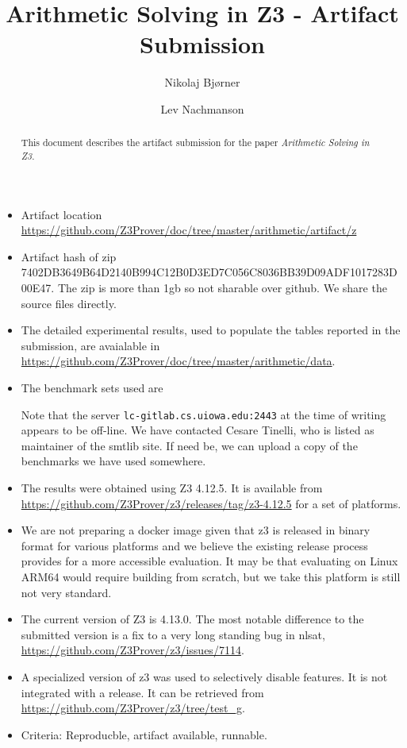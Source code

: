 \documentclass{llncs}
\title{Arithmetic Solving in Z3 - Artifact Submission}
\author{Nikolaj Bj\o{}rner\and
  Lev Nachmanson}
\institute{Microsoft}
\begin{document}
\maketitle

\begin{abstract}
  This document describes the artifact submission for the paper \emph{Arithmetic Solving in Z3}.
\end{abstract}

\begin{itemize}
\item Artifact location \url{https://github.com/Z3Prover/doc/tree/master/arithmetic/artifact/z}
\item Artifact hash of zip 7402DB3649B64D2140B994C12B0D3ED7C056C8036BB39D09ADF1017283D00E47. The zip is more than 1gb so not sharable over github. We share the source files directly.
\item The detailed experimental results, used to populate the tables reported in the submission, are avaialable in \url{https://github.com/Z3Prover/doc/tree/master/arithmetic/data}.
\item The benchmark sets used are
  Note that the server \texttt{lc-gitlab.cs.uiowa.edu:2443} at the time of writing appears to be off-line. We have contacted Cesare Tinelli, who is listed as maintainer of the smtlib site. 
  If need be, we can upload a copy of the benchmarks we have used somewhere.  
\item The results were obtained using Z3  4.12.5. It is available from
  \url{https://github.com/Z3Prover/z3/releases/tag/z3-4.12.5} for a set of platforms.
\item We are not preparing a docker image given that z3 is released in binary format for various platforms and we believe the existing release process provides for a more accessible evaluation. It may be that evaluating on Linux ARM64 would require building from scratch, but we take this platform is still not very standard.
\item The current version of Z3 is 4.13.0. The most notable difference to the submitted version is a fix to a very long standing bug in nlsat,
  \url{https://github.com/Z3Prover/z3/issues/7114}.
  \item A specialized version of z3 was used to selectively disable features. It is not integrated with a release. It can be retrieved from \url{https://github.com/Z3Prover/z3/tree/test_g}.
\item Criteria: Reproducble, artifact available, runnable.
\end{itemize}
\end{document}
